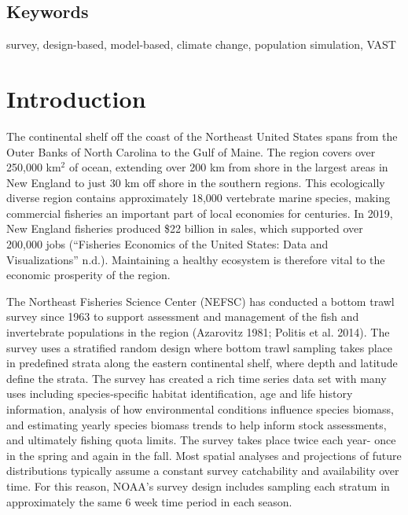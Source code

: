\documentclass[
  12pt,
]{article}
\begin{document}
\hypertarget{keywords}{%
\subsection{Keywords}\label{keywords}}

survey, design-based, model-based, climate change, population simulation, VAST

\newpage

\section{Introduction}

The continental shelf off the coast of the Northeast United States spans from the Outer Banks of North Carolina to the Gulf of Maine. The region covers over 250,000 km\(^2\) of ocean, extending over 200 km from shore in the largest areas in New England to just 30 km off shore in the southern regions. This ecologically diverse region contains approximately 18,000 vertebrate marine species, making commercial fisheries an important part of local economies for centuries. In 2019, New England fisheries produced \$22 billion in sales, which supported over 200,000 jobs ({``{Fisheries Economics of the United States: Data and Visualizations}''} n.d.). Maintaining a healthy ecosystem is therefore vital to the economic prosperity of the region.

The Northeast Fisheries Science Center (NEFSC) has conducted a bottom trawl survey since 1963 to support assessment and management of the fish and invertebrate populations in the region (Azarovitz 1981; Politis et al. 2014). The survey uses a stratified random design where bottom trawl sampling takes place in predefined strata along the eastern continental shelf, where depth and latitude define the strata. The survey has created a rich time series data set with many uses including species-specific habitat identification, age and life history information, analysis of how environmental conditions influence species biomass, and estimating yearly species biomass trends to help inform stock assessments, and ultimately fishing quota limits. The survey takes place twice each year- once in the spring and again in the fall. Most spatial analyses and projections of future distributions typically assume a constant survey catchability and availability over time. For this reason, NOAA's survey design includes sampling each stratum in approximately the same 6 week time period in each season.
\end{document}
